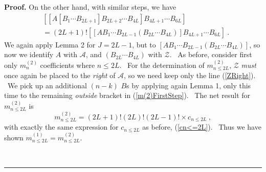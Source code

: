 \documentclass[aps,preprint,tightenlines,unsortedaddress,11pt]{revtex4}\usepackage{amsfonts}
\newenvironment{proof}[1][Proof]{\noindent\textbf{#1.} }{\ \rule{0.5em}{0.5em}}
\begin{document}
\begin{proof}
On the other hand, with similar steps, we have\begin{align}
&  \left[  \left[  A\left[  B_{1}\cdots B_{2L+1}\right]  B_{2L+2}\cdots
B_{4L}\right]  B_{4L+1}\cdots B_{6L}\right] \nonumber\\
&  =\left(  2L+1\right)  !\left[  \left[  AB_{1}\cdots B_{2L-1}\left(
B_{2L}\cdots B_{4L}\right)  \right]  B_{4L+1}\cdots B_{6L}\right]  \ .
\label{m(2)FirstStep}\end{align}
We again apply Lemma 2 for $J=2L-1$, but to $\left[  AB_{1}\cdots
B_{2L-1}\left(  B_{2L}\cdots B_{4L}\right)  \right]  $, so now we identify $A$
with $\mathcal{A}$, and $\left(  B_{2L}\cdots B_{4L}\right)  $ with
$\mathcal{Z}$. \ As before, consider first only $m_{n}^{\left(  2\right)  }$
coefficients where $n\leq2L$. \ For the determination of $m_{n\leq2L}^{\left(
2\right)  }$, $\mathcal{Z}$ \emph{must} once again be placed to the
\emph{right} of $\mathcal{A}$, so we need keep only the line (\ref{ZRight}).
\ We pick up an additional $\left(  n-k\right)  $ $B$s by applying again Lemma
1, only this time to the remaining \emph{outside} bracket in
(\ref{m(2)FirstStep}). \ The net result for $m_{n\leq2L}^{\left(  2\right)  }$
is\begin{equation}
m_{n\leq2L}^{\left(  2\right)  }=\left(  2L+1\right)  !\left(  2L\right)
!\left(  2L-1\right)  !\times c_{n\leq2L}\ ,
\end{equation}
with exactly the same expression for $c_{n\leq2L}$ as before, (\ref{cn<=2L}).
\ Thus we have shown $m_{n\leq2L}^{\left(  1\right)  }=m_{n\leq2L}^{\left(
2\right)  }$.


\end{proof}
\end{document}
